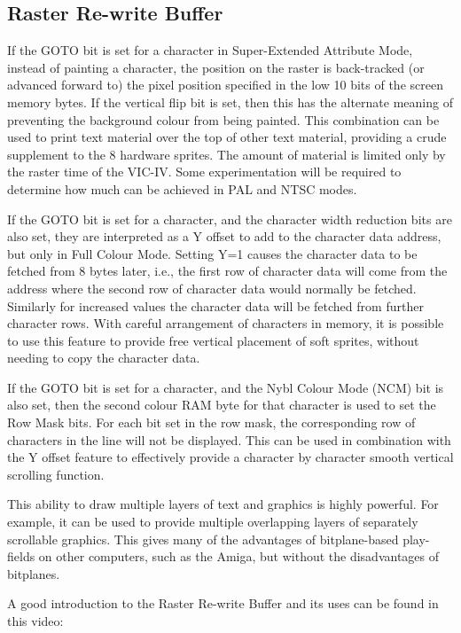 \subsection{Raster Re-write Buffer}

If the GOTO bit is set for a character in Super-Extended Attribute Mode, instead of painting a character, the position on the raster is back-tracked (or advanced forward to) the
pixel position specified in the low 10 bits of the screen memory bytes.  If the vertical flip bit is set, then this has the alternate
meaning of preventing the background colour from being painted.  This combination can be used to print text material over the top of
other text material, providing a crude supplement to the 8 hardware sprites.  The amount of material is limited only by the raster
time of the VIC-IV. Some experimentation will be required to determine how much can be achieved in PAL and NTSC modes.

If the GOTO bit is set for a character, and the character width reduction bits are also set, they are interpreted as a Y offset to add to the character data address, but only in Full Colour Mode.  Setting Y=1 causes the character data to be fetched from 8 bytes later, i.e., the first row of character data will come from the address where the second row of character data would normally be fetched.  Similarly for increased values the character data will be fetched from further character rows.  With careful arrangement of characters in memory, it is possible to use this feature to provide free vertical placement of soft sprites, without needing to copy the character data.

If the GOTO bit is set for a character, and the Nybl Colour Mode (NCM) bit is also set, then the second colour RAM byte for that character is used to set the Row Mask bits. For each bit set in the row mask, the corresponding row of characters in the line will not be displayed. This can be used in combination with the Y offset feature to effectively provide a character by character smooth vertical scrolling function.

This ability to draw multiple layers of text and graphics is highly powerful. For example, it can be used to provide multiple overlapping
layers of separately scrollable graphics.  This gives many of the advantages of bitplane-based play-fields on other computers, such as the
Amiga, but without the disadvantages of bitplanes.

A good introduction to the Raster Re-write Buffer and its uses can be found in this video:


